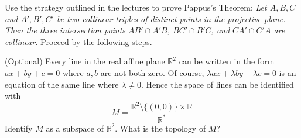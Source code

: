 \documentclass[answers]{exam}
\begin{document}
\begin{questions}


\question%
Use the strategy outlined in the lectures to prove Pappus's Theorem: \emph{Let $A, B, C$ and $A', B', C'$ be two collinear triples of distinct points in the projective plane. Then the three intersection points $A B' \cap A' B$, $B C' \cap B' C$, and $C A' \cap C' A$ are collinear.} Proceed by the following steps.



\question%
(Optional) Every line in the real affine plane $\mathbb{R}^2$ can be written in the form $a x+b y+c=0$ where $a, b$ are not both zero. Of course, $\lambda a x+\lambda b y+\lambda c=0$ is an equation of the same line where $\lambda \neq 0$. Hence the space of lines can be identified with \[
	M=\frac{\mathbb{R}^2 \setminus\{(0,0)\} \times \mathbb{R}}{\mathbb{R}^*}
\] Identify $M$ as a subspace of $\mathbb{R}^2$. What is the topology of $M$?

\end{questions}
\end{document}

